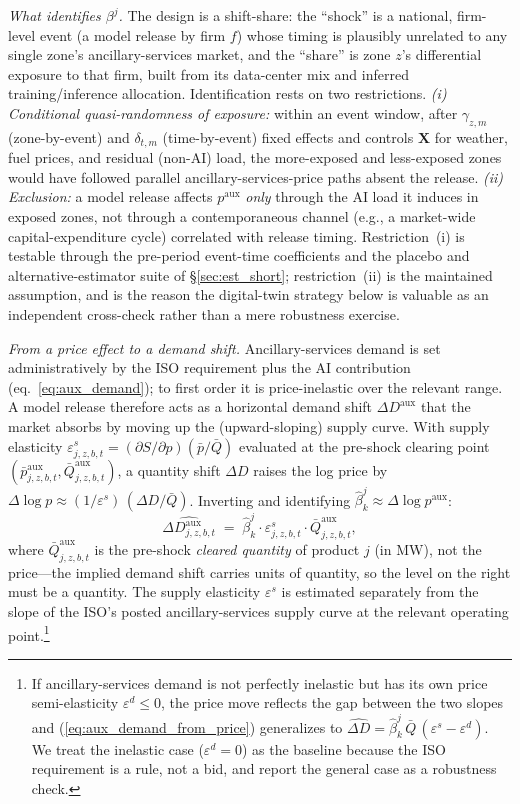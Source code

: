 \documentclass[12pt,letterpaper]{article}
\begin{document}
\emph{What identifies $\beta^j$.} The design is a shift-share: the ``shock'' is
a national, firm-level event (a model release by firm $f$) whose timing is
plausibly unrelated to any single zone's ancillary-services market, and the
``share'' is zone $z$'s differential exposure to that firm, built from its
data-center mix and inferred training/inference allocation. Identification
rests on two restrictions. \emph{(i) Conditional quasi-randomness of exposure:}
within an event window, after $\gamma_{z,m}$ (zone-by-event) and $\delta_{t,m}$
(time-by-event) fixed effects and controls $\mathbf{X}$ for weather, fuel
prices, and residual (non-AI) load, the more-exposed and less-exposed zones
would have followed parallel ancillary-services-price paths absent the release.
\emph{(ii) Exclusion:} a model release affects $p^{\text{aux}}$ \emph{only}
through the AI load it induces in exposed zones, not through a contemporaneous
channel (e.g., a market-wide capital-expenditure cycle) correlated with release
timing. Restriction~(i) is testable through the pre-period event-time
coefficients and the placebo and alternative-estimator suite of
\S\ref{sec:est_short}; restriction~(ii) is the maintained assumption, and is
the reason the digital-twin strategy below is valuable as an independent
cross-check rather than a mere robustness exercise.

\emph{From a price effect to a demand shift.} Ancillary-services demand is set
administratively by the ISO requirement plus the AI contribution
(eq.~\ref{eq:aux_demand}); to first order it is price-inelastic over the
relevant range. A model release therefore acts as a horizontal demand shift
$\Delta D^{\text{aux}}$ that the market absorbs by moving up the
(upward-sloping) supply curve. With supply elasticity
$\varepsilon^s_{j,z,b,t} = (\partial S/\partial p)(\bar p/\bar Q)$ evaluated at
the pre-shock clearing point $(\bar p^{\text{aux}}_{j,z,b,t},
\bar Q^{\text{aux}}_{j,z,b,t})$, a quantity shift $\Delta D$ raises the log
price by $\Delta\log p \approx (1/\varepsilon^s)\,(\Delta D/\bar Q)$. Inverting
and identifying $\hat\beta^j_k \approx \Delta\log p^{\text{aux}}$:
\begin{equation}
\label{eq:aux_demand_from_price}
\widehat{\Delta D^{\text{aux}}_{j,z,b,t}} \;=\; \hat\beta^j_k \cdot
\varepsilon^s_{j,z,b,t} \cdot \bar Q^{\text{aux}}_{j,z,b,t},
\end{equation}
where $\bar Q^{\text{aux}}_{j,z,b,t}$ is the pre-shock \emph{cleared quantity}
of product $j$ (in MW), not the price---the implied demand shift carries units
of quantity, so the level on the right must be a quantity. The supply elasticity
$\varepsilon^s$ is estimated separately from the slope of the ISO's posted
ancillary-services supply curve at the relevant operating point.\footnote{If
ancillary-services demand is not perfectly inelastic but has its own price
semi-elasticity $\varepsilon^d \le 0$, the price move reflects the gap between
the two slopes and (\ref{eq:aux_demand_from_price}) generalizes to
$\widehat{\Delta D} = \hat\beta^j_k\,\bar Q\,(\varepsilon^s-\varepsilon^d)$. We
treat the inelastic case ($\varepsilon^d=0$) as the baseline because the ISO
requirement is a rule, not a bid, and report the general case as a robustness
check.}
\end{document}
